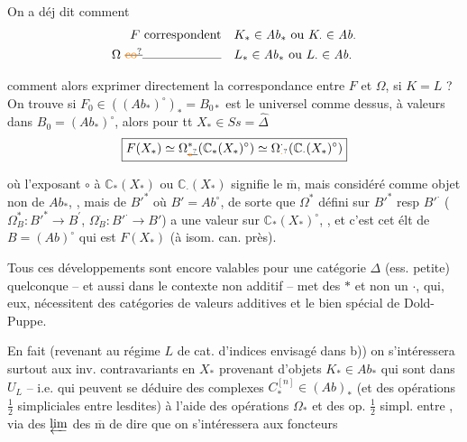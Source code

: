 On a déj dit comment
\[
\begin{aligned}
F\ \text{correspondent}&\quad K_{\ast}\in\mathit{Ab}_{\ast}\ \text{ou}\ K_{\cdot}\in\mathit{Ab}_{\cdot}\\
\Omega\ \deleted{\text{\unsure{co}}}\text{\rule{2.2cm}{0.3pt}}&\quad
L_{\ast}\in\mathit{Ab}_{\ast}\ \text{ou}\ L_{\cdot}\in\mathit{Ab}_{\cdot}
\end{aligned}
\]

comment alors exprimer directement la correspondance entre
$F$ et $\Omega$, si $K=L$ ? On trouve
si $F_0\in((\mathit{Ab}_{\ast})^{\circ})_{\ast}=B_{0\ast}$
 est le  
universel comme dessus, à valeurs dans
$B_0=(\mathit{Ab}_{\ast})^{\circ}$, alors pour tt $X_{\ast}\in\mathit{Ss}=\widehat\Delta$
\[
\boxed{F(X_{\ast})\simeq\Omega_{\deleted{\unsure{\ast}}}^{\ast}(\mathbb C_{\ast}(X_{\ast})^{\circ})\simeq
\Omega_{\unsure{\cdot}}^{\cdot}(\mathbb C_{\cdot}(X_{\ast})^{\circ})}
\]

où l'exposant $\circ$ à $\mathbb C_{\ast}(X_{\ast})$ ou $\mathbb C_{\cdot}(X_{\ast})$
signifie le $\overline{\mathrm m}$, mais considéré comme
objet non de $\mathit{Ab}_{\ast}$, , mais de 
$B'^{\ast}$  où $B'=\mathit{Ab}^{\circ}$, de sorte que $\Omega^{\ast}$
 défini sur 
$B'^{\ast}$ resp $B'^{\cdot}$ ($\Omega_{B}^{\ast}:B'^{\ast}\longrightarrow B^{\prime}$,
$\Omega^{\cdot}_{B}:B'^{\cdot}\longrightarrow B'$)
a une valeur sur $\mathbb C_{\ast}(X_{\ast})^{\circ}$, , et
c'est cet élt de $B=(\mathit{Ab})^{\circ}$ qui est
$F(X_{\ast})$ (à isom. can. près).

Tous ces développements sont encore
valables pour une catégorie $\Delta$ (ess. petite)
quelconque -- et aussi dans le contexte
non additif --   met des
$\ast$ et non un $\cdot$, qui, eux, nécessitent
des catégories de valeurs additives et le
 bien spécial de Dold-Puppe.

En fait (revenant au régime $L$
de cat. d'indices envisagé dans b))
on s'intéressera surtout aux
inv. contravariants en $X_{\ast}$ provenant
d'objets $K_{\ast}\in\mathit{Ab}_{\ast}$ qui sont dans $U_L$ --
i.e. qui peuvent se déduire des
complexes $C_{\ast}^{[n]}\in(\mathit{Ab})_{\ast}$ (et des opérations
$\tfrac12$ simpliciales entre lesdites) à l'aide des
opérations $\Omega_{\ast}$  
et des op. $\tfrac12$ simpl. entre , via des
 $\varprojlim$ des $\overline{\mathrm m}$ de
dire que  on
s'intéressera aux
foncteurs 

